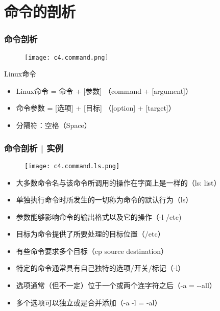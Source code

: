 \section{命令的剖析}
\begin{frame}
  \frametitle{\alert{命令剖析}}
  \begin{figure}
    \centering
    \texttt{[image: c4.command.png]}
  \end{figure}
  \pause
  \begin{block}{Linux命令}
    \begin{itemize}[<+->]
      \item Linux命令 = 命令 + [参数] （command + [argument]）
      \item 命令参数 = [选项] + [目标] （[option] + [target]）
      \item 分隔符：空格（Space）
    \end{itemize}
  \end{block}
\end{frame}

\begin{frame}
  \frametitle{命令剖析 | 实例}
  \begin{figure}
    \centering
    \texttt{[image: c4.command.ls.png]}
  \end{figure}
  \pause
  \begin{itemize}[<+->]
    \item 大多数命令名与该命令所调用的操作在字面上是一样的（ls: list）
    \item 单独执行命令时所发生的一切称为命令的默认行为（ls）
    \item 参数能够影响命令的输出格式以及它的操作（-l /etc)
    \item 目标为命令提供了所要处理的目标位置（/etc）
    \item 有些命令要求多个目标（cp source destination）
    \item 特定的命令通常具有自己独特的选项/开关/标记（-l）
    \item 选项通常（但不一定）位于一个或两个连字符之后（-a = -\!-all）
    \item 多个选项可以独立或是合并添加（-a -l = -al）
  \end{itemize}
\end{frame}


